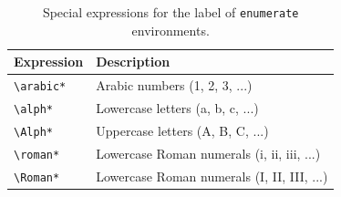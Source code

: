 \documentclass[12pt]{report}
\def\tbs{\textbackslash}
\begin{document}
    \begin{table}[h]
        \centering
        \begin{tabular}{ll}
            \toprule
            \textbf{Expression} & \textbf{Description} \\
            \midrule
            \texttt{\tbs{}arabic*} & Arabic numbers (1, 2, 3, ...) \\
            \texttt{\tbs{}alph*} & Lowercase letters (a, b, c, ...) \\
            \texttt{\tbs{}Alph*} & Uppercase letters (A, B, C, ...) \\
            \texttt{\tbs{}roman*} & Lowercase Roman numerals (i, ii, iii, ...) \\
            \texttt{\tbs{}Roman*} & Lowercase Roman numerals (I, II, III, ...) \\
            \bottomrule
        \end{tabular}
        \caption{Special expressions for the label of \texttt{enumerate} environments.}
        \label{tab:enumerate_special_expressions}
    \end{table}
\end{document}

